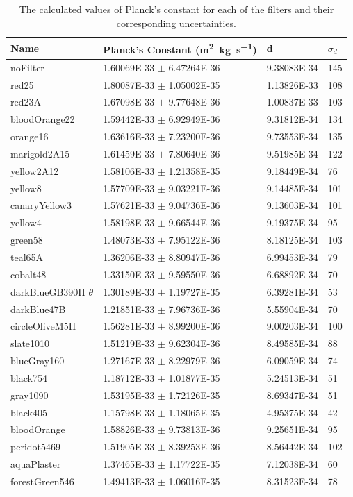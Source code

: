 \documentclass[a4paper]{article}
\begin{document}
\begin{table}[H]
  \caption{The calculated values of Planck's constant for each of the filters
    and their corresponding uncertainties.}
  \begin{center}
    \begin{tabular}{|l|l|l|l|}
      \hline
      Name &    Planck's Constant  (\si{\square\meter\kilo\gram\per\second}) & d & $\sigma_d$\\
      \hline
   noFilter	&	1.60069E-33	\( \pm \)	6.47264E-36	&	9.38083E-34	&	145	\\
red25	&	1.80087E-33	\( \pm \)	1.05002E-35	&	1.13826E-33	&	108	\\
red23A	&	1.67098E-33	\( \pm \)	9.77648E-36	&	1.00837E-33	&	103	\\
bloodOrange22	&	1.59442E-33	\( \pm \)	6.92949E-36	&	9.31812E-34	&	134	\\
orange16	&	1.63616E-33	\( \pm \)	7.23200E-36	&	9.73553E-34	&	135	\\
marigold2A15	&	1.61459E-33	\( \pm \)	7.80640E-36	&	9.51985E-34	&	122	\\
yellow2A12	&	1.58106E-33	\( \pm \)	1.21358E-35	&	9.18449E-34	&	76	\\
yellow8	&	1.57709E-33	\( \pm \)	9.03221E-36	&	9.14485E-34	&	101	\\
canaryYellow3	&	1.57621E-33	\( \pm \)	9.04736E-36	&	9.13603E-34	&	101	\\
yellow4	&	1.58198E-33	\( \pm \)	9.66544E-36	&	9.19375E-34	&	95	\\
green58	&	1.48073E-33	\( \pm \)	7.95122E-36	&	8.18125E-34	&	103	\\
teal65A	&	1.36206E-33	\( \pm \)	8.80947E-36	&	6.99453E-34	&	79	\\
cobalt48	&	1.33150E-33	\( \pm \)	9.59550E-36	&	6.68892E-34	&	70	\\
darkBlueGB390H $\theta$	&	1.30189E-33	\( \pm \)	1.19727E-35	&	6.39281E-34	&	53	\\
darkBlue47B	&	1.21851E-33	\( \pm \)	7.96736E-36	&	5.55904E-34	&	70	\\
circleOliveM5H	&	1.56281E-33	\( \pm \)	8.99200E-36	&	9.00203E-34	&	100	\\
slate1010	&	1.51219E-33	\( \pm \)	9.62304E-36	&	8.49585E-34	&	88	\\
blueGray160	&	1.27167E-33	\( \pm \)	8.22979E-36	&	6.09059E-34	&	74	\\
black754	&	1.18712E-33	\( \pm \)	1.01877E-35	&	5.24513E-34	&	51	\\
gray1090	&	1.53195E-33	\( \pm \)	1.72126E-35	&	8.69347E-34	&	51	\\
black405	&	1.15798E-33	\( \pm \)	1.18065E-35	&	4.95375E-34	&	42	\\
bloodOrange	&	1.58826E-33	\( \pm \)	9.73813E-36	&	9.25651E-34	&	95	\\
peridot5469 	&	1.51905E-33	\( \pm \)	8.39253E-36	&	8.56442E-34	&	102	\\
aquaPlaster	&	1.37465E-33	\( \pm \)	1.17722E-35	&	7.12038E-34	&	60	\\
forestGreen546	&	1.49413E-33	\( \pm \)	1.06016E-35	&	8.31523E-34	&	78	\\


\end{tabular}
\end{center}
\end{table}
\end{document}
